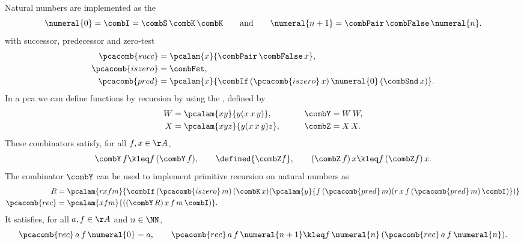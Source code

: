 %
Natural numbers are implemented as the
%
%
%
\label{sym:curry_numeral}%
%
%
\begin{equation}
  \label{eq:curry-numeral}%
  \numeral{0} = \combI = \combS\, \combK\, \combK
  \qquad\text{and}\qquad
  \numeral{n+1} = \combPair \, \combFalse \, \numeral{n}.
\end{equation}
%
with successor, predecessor and zero-test
%
%
%
%
%
\begin{align*}
  \pcacomb{succ} &= \pcalam{x}{\combPair \, \combFalse \,x},\\ 
  \pcacomb{iszero} &= \combFst,\\
  \pcacomb{pred} &=
  \pcalam{x}{\combIf\, (\pcacomb{iszero}\, x)\, \numeral{0}\, (\combSnd\, x)}.
\end{align*}
%
In a pca we can define functions by recursion by using the
%
%
%
%
%
\label{sym:combY}%
\label{sym:combZ}%
\label{sym:combW}%
%
, defined by
%
\begin{alignat*}{2}
  W &= \pcalam{x y}{y(x\, x\, y)}, &
  \qquad
  \combY &= W\, W, \\
  X &= \pcalam{x y z}{y (x\, x\, y) z}, &
  \qquad
  \combZ &= X\, X.
\end{alignat*}
%
These combinators satisfy, for all $f, x \in \AA$,
%
\begin{equation*}
  \combY\, f \kleq f\, (\combY\, f),
  \qquad
  \defined{\combZ f},
  \qquad
  (\combZ\, f)\, x \kleq f\, (\combZ f)\, x.
\end{equation*}
%
The combinator $\combY$ can be used to implement primitive recursion on natural numbers as
%
%
%
\begin{align*}
   R &= \pcalam{r x f m}{\combIf\, (\pcacomb{iszero}\, m)\, (\combK\, x)
        (\pcalam{y}{f\, (\pcacomb{pred}\, m)(r\, x\, f\, (\pcacomb{pred}\, m)\,
        \combI)})}
  \\
  \pcacomb{rec} &= \pcalam{x f m}{((\combY\, R)\, x\, f\, m\, \combI)}.
\end{align*}
%
It satisfies, for all $a, f \in \AA$ and $n \in \NN$,
%
\begin{equation*}
  \pcacomb{rec}\, a\, f\, \numeral{0} = a,\qquad
  \pcacomb{rec}\, a\, f\, \numeral{n+1} \kleq
    f\, \numeral{n}\, (\pcacomb{rec}\, a\, f\, \numeral{n}).
\end{equation*}

